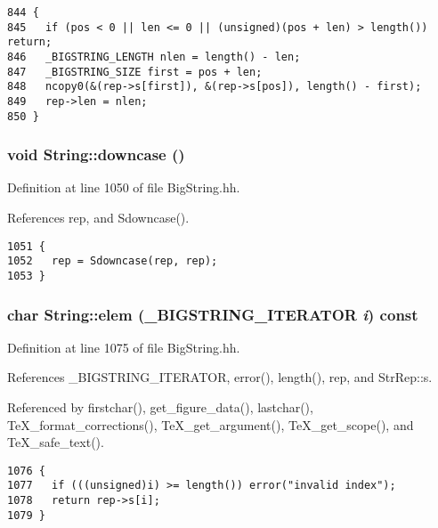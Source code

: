 \footnotesize\begin{verbatim}844 {
845   if (pos < 0 || len <= 0 || (unsigned)(pos + len) > length()) return;
846   _BIGSTRING_LENGTH nlen = length() - len;
847   _BIGSTRING_SIZE first = pos + len;
848   ncopy0(&(rep->s[first]), &(rep->s[pos]), length() - first);
849   rep->len = nlen;
850 }
\end{verbatim}\normalsize 
{}
\subsubsection{\setlength{\rightskip}{0pt plus 5cm}void String::downcase ()\hspace{0.3cm}{\tt  [inline]}}\label{classString_a96}




Definition at line 1050 of file Big\-String.hh.

References rep, and Sdowncase().



\footnotesize\begin{verbatim}1051 {
1052   rep = Sdowncase(rep, rep);
1053 }
\end{verbatim}\normalsize 
{}
\subsubsection{\setlength{\rightskip}{0pt plus 5cm}char String::elem ({\bf \_\-BIGSTRING\_\-ITERATOR} {\em i}) const\hspace{0.3cm}{\tt  [inline]}}\label{classString_a100}




Definition at line 1075 of file Big\-String.hh.

References \_\-BIGSTRING\_\-ITERATOR, error(), length(), rep, and Str\-Rep::s.

Referenced by firstchar(), get\_\-figure\_\-data(), lastchar(), Te\-X\_\-format\_\-corrections(), Te\-X\_\-get\_\-argument(), Te\-X\_\-get\_\-scope(), and Te\-X\_\-safe\_\-text().



\footnotesize\begin{verbatim}1076 { 
1077   if (((unsigned)i) >= length()) error("invalid index");
1078   return rep->s[i];
1079 }
\end{verbatim}\normalsize 
{}
